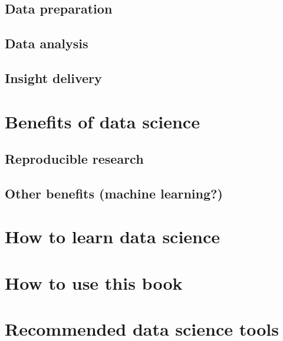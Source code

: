 \documentclass[
]{book}
\begin{document}
\hypertarget{data-preparation}{%
\subsection{Data preparation}\label{data-preparation}}

\hypertarget{data-analysis}{%
\subsection{Data analysis}\label{data-analysis}}

\hypertarget{insight-delivery}{%
\subsection{Insight delivery}\label{insight-delivery}}

\hypertarget{benefits-of-data-science}{%
\section{Benefits of data science}\label{benefits-of-data-science}}

\hypertarget{reproducible-research}{%
\subsection{Reproducible research}\label{reproducible-research}}

\hypertarget{other-benefits-machine-learning}{%
\subsection{Other benefits (machine learning?)}\label{other-benefits-machine-learning}}

\hypertarget{how-to-learn-data-science}{%
\section{How to learn data science}\label{how-to-learn-data-science}}

\hypertarget{how-to-use-this-book}{%
\section{How to use this book}\label{how-to-use-this-book}}

\hypertarget{recommended-data-science-tools}{%
\section{Recommended data science tools}\label{recommended-data-science-tools}}
\end{document}
